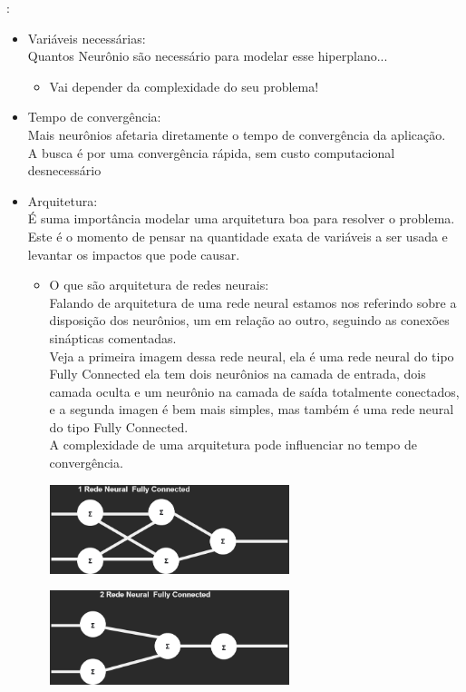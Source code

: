 :
\begin{itemize} 
\item Variáveis necessárias:\\
Quantos Neurônio são necessário para modelar esse hiperplano...
\begin{itemize}
\item Vai depender da complexidade do seu problema! 
\end{itemize}
\item Tempo de convergência:\\
Mais neurônios afetaria diretamente o tempo de convergência da aplicação.\\  
A busca é por uma convergência rápida, sem custo computacional desnecessário\\
\item Arquitetura:\\
É suma importância modelar uma arquitetura boa para resolver o problema. 
Este é o momento de pensar na quantidade exata de variáveis a ser usada
e levantar os impactos que pode causar.
    \begin{itemize}
\item O que são arquitetura de redes neurais:\\
Falando de arquitetura de uma rede neural estamos nos referindo sobre a disposição dos neurônios, um em relação ao outro, seguindo as conexões sinápticas comentadas.\\
Veja a primeira imagem dessa rede neural, ela é uma rede neural do tipo Fully Connected
ela tem dois neurônios na camada de entrada, dois camada oculta e um neurônio na camada de saída totalmente conectados,
e a segunda imagen é bem mais simples, mas também é uma rede  neural  do  tipo  Fully  Connected.\\
A complexidade de uma arquitetura pode influenciar no tempo de convergência. \cite{arquiteturaRN}
\begin{center}
    \includegraphics[width=7cm]{images/1_RN_FULLY CONNECTED.png}\break
    
\end{center}
\begin{center}
    
     \includegraphics[width=7cm]{images/2_RN_FULLY CONNECTED.png}\break
\end{center}

    \end{itemize}
    

\end{itemize}




